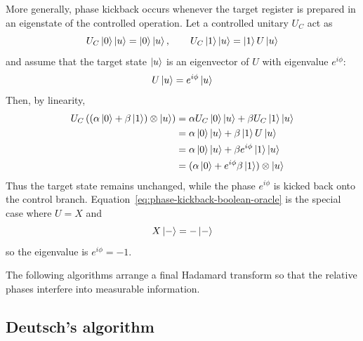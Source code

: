 More generally, phase kickback occurs whenever the target register is prepared in an eigenstate of the controlled operation.
Let a controlled unitary $U_C$ act as
\[
U_C\ket0\ket u
=
\ket0\ket u,
\qquad
U_C\ket1\ket u
=
\ket1 U\ket u
\]
and assume that the target state $\ket u$ is an eigenvector of $U$ with eigenvalue $e^{i\phi}$:
\[
U\ket u
=
e^{i\phi}\ket u
\]
Then, by linearity,
\[
\begin{aligned}
U_C
\left(
(\alpha\ket0+\beta\ket1)
\otimes
\ket u
\right)
&=
\alpha U_C\ket0\ket u
+ 
\beta U_C\ket1\ket u \\
&=
\alpha\ket0\ket u
+ 
\beta\ket1 U\ket u \\
&=
\alpha\ket0\ket u
+ 
\beta e^{i\phi}\ket1\ket u \\
&=
(\alpha\ket0+e^{i\phi}\beta\ket1)
\otimes
\ket u
\end{aligned}
\]
Thus the target state remains unchanged, while the phase $e^{i\phi}$ is kicked back onto the control branch.
Equation~\eqref{eq:phase-kickback-boolean-oracle} is the special case where $U=X$ and
\[
X\ket{-}=-\ket{-}
\]
so the eigenvalue is $e^{i\phi}=-1$.

The following algorithms arrange a final Hadamard transform so that the relative phases interfere into measurable information.

\subsection{Deutsch's algorithm}\label{sec:deutsch-algorithm}

